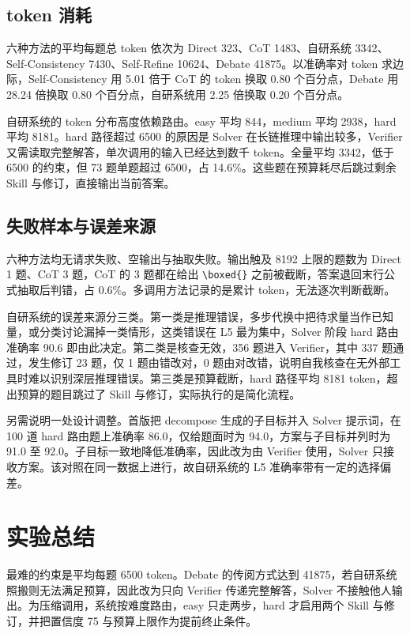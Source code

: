 \documentclass[12pt]{ctexart}
\begin{document}
\subsection{token 消耗}

六种方法的平均每题总 token 依次为 Direct 323、CoT 1483、自研系统 3342、Self-Consistency 7430、Self-Refine 10624、Debate 41875。以准确率对 token 求边际，Self-Consistency 用 5.01 倍于 CoT 的 token 换取 0.80 个百分点，Debate 用 28.24 倍换取 0.80 个百分点，自研系统用 2.25 倍换取 0.20 个百分点。

自研系统的 token 分布高度依赖路由。easy 平均 844，medium 平均 2938，hard 平均 8181。hard 路径超过 6500 的原因是 Solver 在长链推理中输出较多，Verifier 又需读取完整解答，单次调用的输入已经达到数千 token。全量平均 3342，低于 6500 的约束，但 73 题单题超过 6500，占 14.6\%。这些题在预算耗尽后跳过剩余 Skill 与修订，直接输出当前答案。

\subsection{失败样本与误差来源}

六种方法均无请求失败、空输出与抽取失败。输出触及 8192 上限的题数为 Direct 1 题、CoT 3 题，CoT 的 3 题都在给出 \verb|\boxed{}| 之前被截断，答案退回末行公式抽取后判错，占 0.6\%。多调用方法记录的是累计 token，无法逐次判断截断。

自研系统的误差来源分三类。第一类是推理错误，多步代换中把待求量当作已知量，或分类讨论漏掉一类情形，这类错误在 L5 最为集中，Solver 阶段 hard 路由准确率 90.6 即由此决定。第二类是核查无效，356 题进入 Verifier，其中 337 题通过，发生修订 23 题，仅 1 题由错改对，0 题由对改错，说明自我核查在无外部工具时难以识别深层推理错误。第三类是预算截断，hard 路径平均 8181 token，超出预算的题目跳过了 Skill 与修订，实际执行的是简化流程。

另需说明一处设计调整。首版把 decompose 生成的子目标并入 Solver 提示词，在 100 道 hard 路由题上准确率 86.0，仅给题面时为 94.0，方案与子目标并列时为 91.0 至 92.0。子目标一致地降低准确率，因此改为由 Verifier 使用，Solver 只接收方案。该对照在同一数据上进行，故自研系统的 L5 准确率带有一定的选择偏差。

\section{实验总结}

最难的约束是平均每题 6500 token。Debate 的传阅方式达到 41875，若自研系统照搬则无法满足预算，因此改为只向 Verifier 传递完整解答，Solver 不接触他人输出。为压缩调用，系统按难度路由，easy 只走两步，hard 才启用两个 Skill 与修订，并把置信度 75 与预算上限作为提前终止条件。
\end{document}
